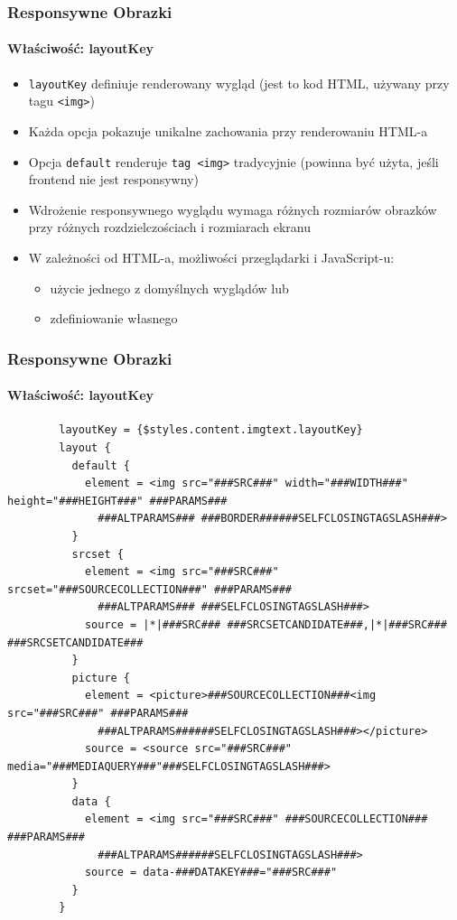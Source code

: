 \begin{frame}[fragile]
	\frametitle{Responsywne Obrazki}
	\framesubtitle{Właściwość: layoutKey}

	\begin{itemize}
		\item \texttt{layoutKey} definiuje renderowany wygląd\newline
			(jest to kod HTML, używany przy tagu \texttt{<img>})
		\item Każda opcja pokazuje unikalne zachowania przy renderowaniu HTML-a
		\item Opcja \texttt{default} renderuje \texttt{tag <img>} tradycyjnie\newline
			(powinna być użyta, jeśli frontend nie jest responsywny)
		\item Wdrożenie responsywnego wyglądu wymaga różnych rozmiarów obrazków przy różnych rozdzielczościach i rozmiarach ekranu
		\item W zależności od HTML-a, możliwości przeglądarki i JavaScript-u:

			\begin{itemize}
				\item użycie jednego z domyślnych wyglądów lub
				\item zdefiniowanie własnego
			\end{itemize}

	\end{itemize}

\end{frame}


\begin{frame}[fragile]
	\frametitle{Responsywne Obrazki}
	\framesubtitle{Właściwość: layoutKey}

	\lstset{
		basicstyle=\tiny\ttfamily
	}

	\begin{lstlisting}
		layoutKey = {$styles.content.imgtext.layoutKey}
		layout {
		  default {
		    element = <img src="###SRC###" width="###WIDTH###" height="###HEIGHT###" ###PARAMS###
		      ###ALTPARAMS### ###BORDER######SELFCLOSINGTAGSLASH###>
		  }
		  srcset {
		    element = <img src="###SRC###" srcset="###SOURCECOLLECTION###" ###PARAMS###
		      ###ALTPARAMS### ###SELFCLOSINGTAGSLASH###>
		    source = |*|###SRC### ###SRCSETCANDIDATE###,|*|###SRC### ###SRCSETCANDIDATE###
		  }
		  picture {
		    element = <picture>###SOURCECOLLECTION###<img src="###SRC###" ###PARAMS###
		      ###ALTPARAMS######SELFCLOSINGTAGSLASH###></picture>
		    source = <source src="###SRC###" media="###MEDIAQUERY###"###SELFCLOSINGTAGSLASH###>
		  }
		  data {
		    element = <img src="###SRC###" ###SOURCECOLLECTION### ###PARAMS###
		      ###ALTPARAMS######SELFCLOSINGTAGSLASH###>
		    source = data-###DATAKEY###="###SRC###"
		  }
		}
	\end{lstlisting}

\end{frame}

